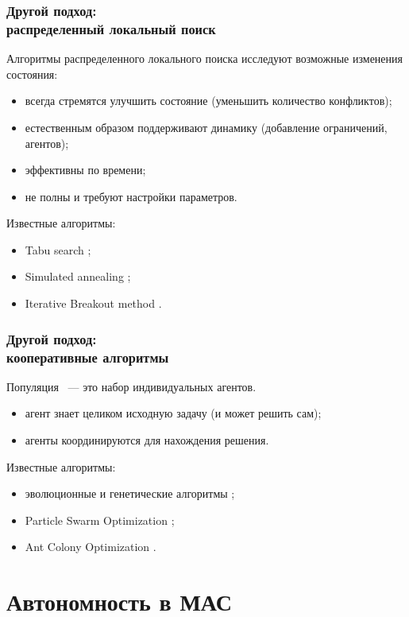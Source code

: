 \documentclass{beamer}
\begin{document}
\begin{frame}
  \frametitle{Другой подход: \\ распределенный локальный поиск}
  Алгоритмы распределенного локального поиска исследуют возможные изменения состояния:
  \begin{itemize}
    \item всегда стремятся улучшить состояние (уменьшить количество конфликтов);
    \item естественным образом поддерживают динамику (добавление ограничений, агентов);
    \item эффективны по времени;
    \item не полны и требуют настройки параметров.
  \end{itemize}

  Известные алгоритмы:
  \begin{itemize}
    \item Tabu search \cite{Glover1997};
    \item Simulated annealing \cite{Radenski2012};
    \item Iterative Breakout method \cite{Hirayama2005}.
  \end{itemize}
\end{frame}

\begin{frame}
  \frametitle{Другой подход: \\ кооперативные алгоритмы}
  Популяция ~--- это набор индивидуальных агентов.
  \begin{itemize}
    \item агент знает целиком исходную задачу (и может решить сам);
    \item агенты координируются для нахождения решения.
  \end{itemize}

  Известные алгоритмы:
  \begin{itemize}
    \item эволюционные и генетические алгоритмы \cite{Dozier2007, Handa2003};
    \item Particle Swarm Optimization \cite{Parsopoulos2002};
    \item Ant Colony Optimization \cite{Dorigo02}.
  \end{itemize}
\end{frame}

\section{Автономность в МАС}
\end{document}
